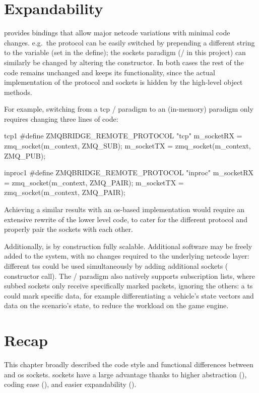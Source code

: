 \section{Expandability}\label{sc:code:expandability}

 provides bindings that allow major \gls{netcode} variations with minimal code changes. e.g.\ the protocol can be easily switched by prepending a different string to the  variable (set in the  define); the sockets paradigm (/ in this project) can similarly be changed by altering the constructor. In both cases the rest of the code remains unchanged and keeps its functionality, since the actual implementation of the protocol and sockets is hidden by the high-level object methods.

For example, switching from a \gls{tcp} / paradigm to an  (in-memory)  paradigm only requires changing three lines of code:

\begin{codelist}{\gls{tcp}}{1}
#define ZMQBRIDGE_REMOTE_PROTOCOL "tcp"
m_socketRX = zmq_socket(m_context, ZMQ_SUB);
m_socketTX = zmq_socket(m_context, ZMQ_PUB);
\end{codelist}

\begin{codelist}{inproc}{1}
#define ZMQBRIDGE_REMOTE_PROTOCOL "inproc"
m_socketRX = zmq_socket(m_context, ZMQ_PAIR);
m_socketTX = zmq_socket(m_context, ZMQ_PAIR);
\end{codelist}

\FLOATnoindent Achieving a similar results with an \gls{os}-based implementation would require an extensive rewrite of the lower level code, to cater for the different protocol and properly pair the sockets with each other.

Additionally,  is by construction fully scalable. Additional software may be freely added to the system, with no changes required to the underlying \gls{netcode} layer: different \glspl{ts} could be used simultaneously by adding additional sockets ( constructor call). The  / paradigm also natively supports subscription lists, where subbed sockets only receive specifically marked packets, ignoring the others: a \gls{ts} could mark specific data, for example differentiating a vehicle's state vectors and data on the scenario's state, to reduce the workload on the game engine.

\section{Recap}\label{sc:code:recap}

This chapter broadly described the code style and functional differences between  and \gls{os} sockets.  sockets have a large advantage thanks to higher abstraction (), coding ease (), and easier expandability ().
